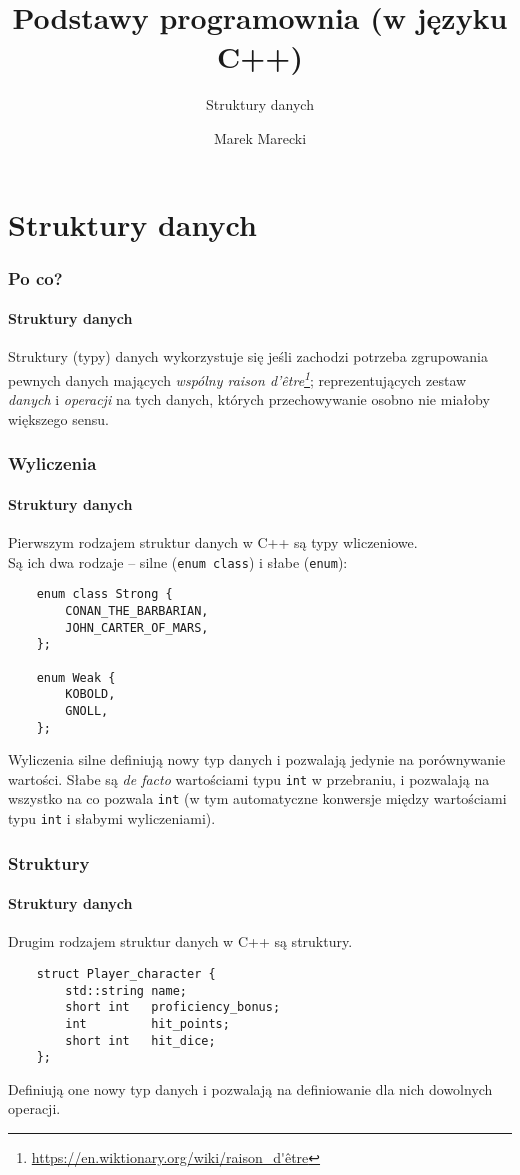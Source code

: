 \documentclass[aspectratio=169,10pt]{beamer}
\title{Podstawy programownia (w języku C++)}
\subtitle{Struktury danych}
\author{Marek Marecki}
\institute{Polsko-Japońska Akademia Technik Komputerowych}
\begin{document}
{%
    \frame{\titlepage}
}

\section{Struktury danych}

\begin{frame}
    \frametitle{Po co?}
    \framesubtitle{Struktury danych}

    Struktury (typy) danych wykorzystuje się jeśli zachodzi potrzeba zgrupowania
    pewnych danych mających \emph{wspólny raison
    d'être\footnote{\url{https://en.wiktionary.org/wiki/raison_d'être}}};
    reprezentujących zestaw \emph{danych} i \emph{operacji} na tych danych,
    których przechowywanie osobno nie miałoby większego sensu.


\end{frame}

\begin{frame}[fragile]
    \frametitle{Wyliczenia}
    \framesubtitle{Struktury danych}

    Pierwszym rodzajem struktur danych w C++ są typy wliczeniowe.\\
    Są ich dwa rodzaje -- silne (\texttt{enum class}) i słabe (\texttt{enum}):

    {\scriptsize
    \begin{lstlisting}
    enum class Strong {
        CONAN_THE_BARBARIAN,
        JOHN_CARTER_OF_MARS,
    };

    enum Weak {
        KOBOLD,
        GNOLL,
    };
    \end{lstlisting}}

    Wyliczenia silne definiują nowy typ danych i pozwalają jedynie na
    porównywanie wartości.
    Słabe są \emph{de facto} wartościami typu \texttt{int} w przebraniu, i
    pozwalają na wszystko na co pozwala \texttt{int} (w tym automatyczne
    konwersje między wartościami typu \texttt{int} i słabymi wyliczeniami).
\end{frame}

\begin{frame}[fragile]
    \frametitle{Struktury}
    \framesubtitle{Struktury danych}

    Drugim rodzajem struktur danych w C++ są struktury.

    {\scriptsize
    \begin{lstlisting}
    struct Player_character {
        std::string name;
        short int   proficiency_bonus;
        int         hit_points;
        short int   hit_dice;
    };
    \end{lstlisting}}

    Definiują one nowy typ danych i pozwalają na definiowanie dla nich dowolnych
    operacji.
\end{frame}
\end{document}
